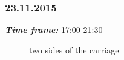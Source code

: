 \subsubsection{23.11.2015}
\textit{\textbf{Time frame:}} 17:00-21:30 \newline


\begin{figure}[H]
	\begin{minipage}[h]{1\linewidth}
		\caption{two sides of the carriage}
	\end{minipage}
\end{figure}

